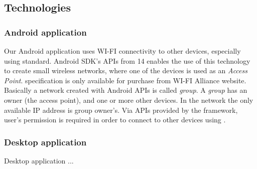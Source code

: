 \subsection{Technologies}

\subsubsection{Android application}
Our Android application uses WI-FI connectivity to other devices, especially using \direct standard. Android SDK's APIs from 14 enables the use of this technology to create small wireless networks, where one of the devices is used as an \emph{Access Point}. \direct specification is only available for purchase from WI-FI Alliance\textsuperscript{\texttrademark} website\cite{wifi_direct}.
Basically a network created with Android \direct APIs is called \emph{group}. A \emph{group} has an owner (the access point), and one or more other devices. In the network the only available IP address is group owner's. 
Via APIs provided by the framework, user's permission is required in order to connect to other devices using \direct.

\subsubsection{Desktop application}
Desktop application ...
